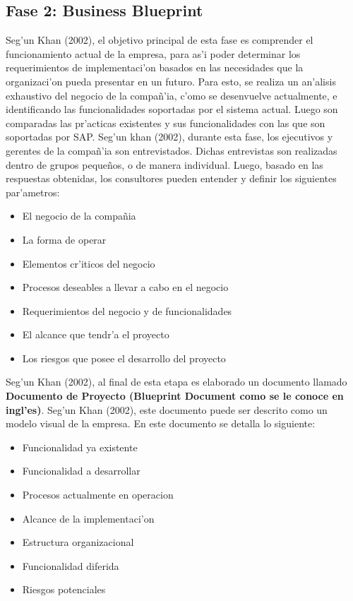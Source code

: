 \subsection{Fase 2: Business Blueprint}
Seg'un Khan (2002), el objetivo principal de esta fase es comprender el funcionamiento actual de la empresa, para as'i poder determinar los requerimientos de implementaci'on basados en las necesidades que la organizaci'on pueda presentar en un futuro. Para esto, se realiza un an'alisis exhaustivo del negocio de la compa\~n'ia, c'omo se desenvuelve actualmente, e identificando las funcionalidades soportadas por el sistema actual. Luego son comparadas las pr'acticas existentes y sus funcionalidades  con las que son soportadas por SAP. 
\newline
\newline
\indent Seg'un khan (2002), durante esta fase, los ejecutivos y gerentes de la compa\~n'ia son entrevistados. Dichas entrevistas son realizadas dentro de grupos peque\~nos, o de manera individual. Luego, basado en las respuestas obtenidas, los consultores pueden entender y definir los siguientes par'ametros:
\begin{itemize}
\item El negocio de la compa\~nia
\item La forma de operar
\item Elementos cr'iticos del negocio
\item Procesos deseables a llevar a cabo en el negocio
\item Requerimientos del negocio y de funcionalidades
\item El alcance que tendr'a el proyecto
\item Los riesgos que posee el desarrollo del proyecto
\end{itemize}
Seg'un Khan (2002), al final de esta etapa es elaborado un documento llamado \textbf{Documento de Proyecto (Blueprint Document como se le conoce en ingl'es)}. 
Seg'un Khan (2002), este documento puede ser descrito como un modelo visual de la empresa. En este documento se detalla lo siguiente:
\begin{itemize}
\item Funcionalidad ya existente
\item Funcionalidad a desarrollar
\item Procesos actualmente en operacion
\item Alcance de la implementaci'on
\item Estructura organizacional
\item Funcionalidad diferida
\item Riesgos potenciales
\end{itemize}
